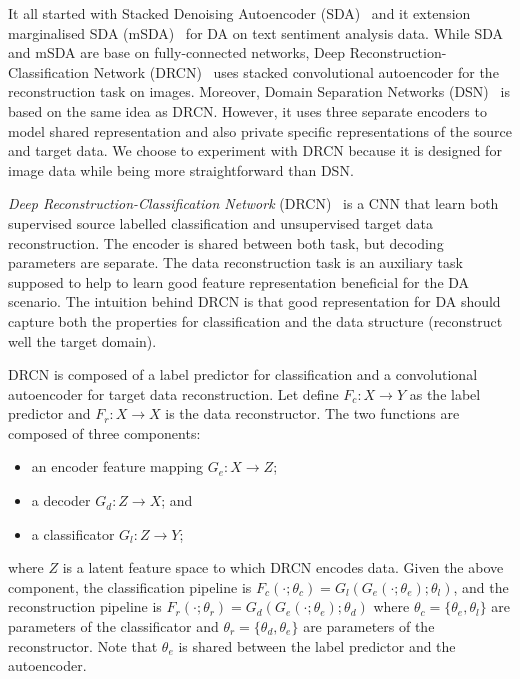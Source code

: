 It all started with Stacked Denoising Autoencoder (SDA)~\cite{glorot2011}
and it extension marginalised SDA (mSDA)~\cite{chen2012} for DA on text sentiment analysis data.
While SDA and mSDA are base on fully-connected networks,
Deep Reconstruction-Classification Network (DRCN)~\cite{ghifary2016}
uses stacked convolutional autoencoder for the reconstruction task on images.
Moreover, Domain Separation Networks (DSN)~\cite{bousmalis2016} is based on the same idea as DRCN.
However, it uses three separate encoders to model shared representation
and also private specific representations of the source and target data.
We choose to experiment with DRCN
because it is designed for image data while being more straightforward than DSN.

\textit{Deep Reconstruction-Classification Network} (DRCN)~\cite{ghifary2016} is a CNN that learn both supervised source labelled classification and unsupervised target data reconstruction.
The encoder is shared between both task, but decoding parameters are separate.
The data reconstruction task is an auxiliary task supposed to help to learn good feature representation beneficial for the DA scenario.
The intuition behind DRCN is
that good representation for DA should capture both the properties for classification and the data structure
(reconstruct well the target domain).

DRCN is composed of a label predictor for classification
and a convolutional autoencoder for target data reconstruction.
Let define \(F_c: X \to Y\) as the label predictor
and \(F_r: X \to X\) is the data reconstructor.
The two functions are composed of three components:

\begin{itemize}
	\item an encoder feature mapping \(G_e: X \to Z\);
	\item a decoder \(G_d: Z \to X\); and
	\item a classificator \(G_l: Z \to Y\);
\end{itemize}

where \(Z\) is a latent feature space to which DRCN encodes data.
Given the above component,
the classification pipeline is \(F_c(\cdot; \theta_c) = G_l(G_e(\cdot; \theta_e); \theta_l)\),
and the reconstruction pipeline is \(F_r(\cdot; \theta_r) = G_d(G_e(\cdot; \theta_e); \theta_d)\)
where \(\theta_c = \{\theta_e, \theta_l\}\) are parameters of the classificator
and \(\theta_r = \{\theta_d, \theta_e\}\) are parameters of the reconstructor.
Note that \(\theta_e\) is shared between the label predictor and the autoencoder.

